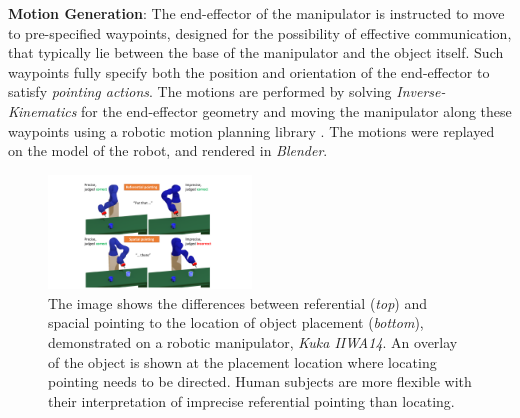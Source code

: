 \noindent\textbf{Motion Generation}: The end-effector of the manipulator is instructed to move to pre-specified waypoints, designed for the possibility of effective communication, that typically lie between the base of the manipulator and the object itself. Such waypoints fully specify both the position and orientation of the end-effector to satisfy \textit{pointing actions}. The motions are performed by solving \textit{Inverse-Kinematics} for the end-effector geometry and moving the manipulator along these waypoints using a robotic motion planning library 
\cite{pracsys2014}.
The motions were replayed on the model of the robot, and rendered in \textit{Blender}.


\begin{figure}[t]
    \centering
    \includegraphics[width=0.48\textwidth]{spatial-referential.pdf}
    \caption{The image shows the differences between referential (\textit{top}) and spacial pointing to the location of object placement (\textit{bottom}), demonstrated on a robotic manipulator, \textit{Kuka IIWA14}. An overlay of the object is shown at the placement location where locating pointing needs to be directed.  Human subjects are more flexible with their interpretation of imprecise referential pointing than locating.}
    \label{fig:spatial}
\end{figure}



